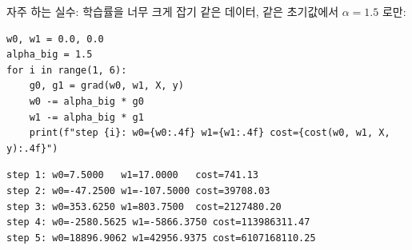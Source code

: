 \begin{frame}[fragile]{자주 하는 실수: 학습률을 너무 크게 잡기}
  같은 데이터, 같은 초기값에서 $\alpha = 1.5$ 로만:
\begin{lstlisting}
w0, w1 = 0.0, 0.0
alpha_big = 1.5
for i in range(1, 6):
    g0, g1 = grad(w0, w1, X, y)
    w0 -= alpha_big * g0
    w1 -= alpha_big * g1
    print(f"step {i}: w0={w0:.4f} w1={w1:.4f} cost={cost(w0, w1, X, y):.4f}")
\end{lstlisting}
  \scriptsize
  \begin{verbatim}
step 1: w0=7.5000   w1=17.0000   cost=741.13
step 2: w0=-47.2500 w1=-107.5000 cost=39708.03
step 3: w0=353.6250 w1=803.7500  cost=2127480.20
step 4: w0=-2580.5625 w1=-5866.3750 cost=113986311.47
step 5: w0=18896.9062 w1=42956.9375 cost=6107168110.25
  \end{verbatim}
\end{frame}
